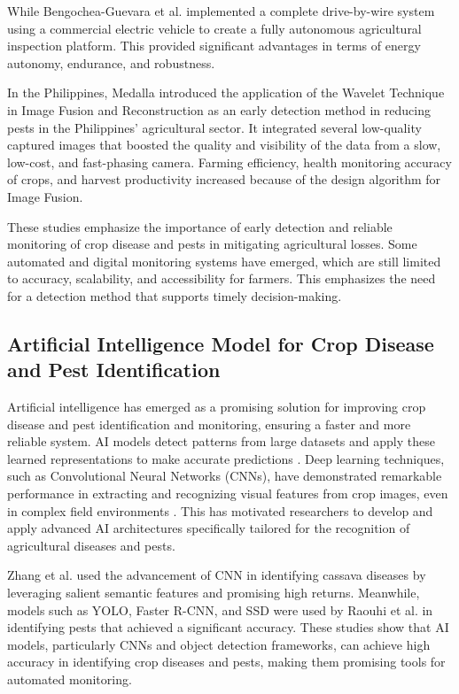 \documentclass{icsthesis}
\begin{document}
\begin{mainmatter}
            While Bengochea-Guevara et al. \cite{Bengochea-Guevara_Montes_Andújar_Barra_Conejero_Ribeiro_2025} implemented a complete drive-by-wire system using a commercial electric vehicle to create a fully autonomous agricultural inspection platform. This provided significant advantages in terms of energy autonomy, endurance, and robustness.

            In the Philippines, Medalla \cite{Medalla_2018} introduced the application of the Wavelet Technique in Image Fusion and Reconstruction as an early detection method in reducing pests in the Philippines' agricultural sector. It integrated several low-quality captured images that boosted the quality and visibility of the data from a slow, low-cost, and fast-phasing camera. Farming efficiency, health monitoring accuracy of crops, and harvest productivity increased because of the design algorithm for Image Fusion.

            These studies emphasize the importance of early detection and reliable monitoring of crop disease and pests in mitigating agricultural losses. Some automated and digital monitoring systems have emerged, which are still limited to accuracy, scalability, and accessibility for farmers. This emphasizes the need for a detection method that supports timely decision-making.

            \subsection{Artificial Intelligence Model for Crop Disease and Pest Identification}
            Artificial intelligence has emerged as a promising solution for improving crop disease and pest identification and monitoring, ensuring a faster and more reliable system. AI models detect patterns from large datasets and apply these learned representations to make accurate predictions \cite{ibm-2025}. Deep learning techniques, such as Convolutional Neural Networks (CNNs), have demonstrated remarkable performance in extracting and recognizing visual features from crop images, even in complex field environments \cite{zhang-2024, lu-2025, raouhi-2022, mique-2018}. This has motivated researchers to develop and apply advanced AI architectures specifically tailored for the recognition of agricultural diseases and pests.

            Zhang et al. \cite{zhang-2024} used the advancement of CNN in identifying cassava diseases by leveraging salient semantic features and promising high returns. Meanwhile, models such as YOLO, Faster R-CNN, and SSD were used by Raouhi et al. \cite{raouhi-2022} in identifying pests that achieved a significant accuracy. These studies show that AI models, particularly CNNs and object detection frameworks, can achieve high accuracy in identifying crop diseases and pests, making them promising tools for automated monitoring.


\end{mainmatter}
\end{document}
